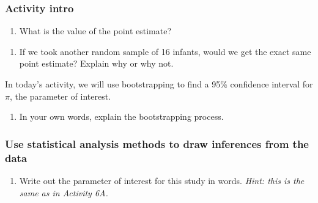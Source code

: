 \documentclass[
]{report}
\providecommand{\tightlist}{%
  \setlength{\itemsep}{0pt}\setlength{\parskip}{0pt}}
\begin{document}
\hypertarget{activity-intro}{%
\subsubsection*{Activity intro}\label{activity-intro}}

\begin{enumerate}
\def\labelenumi{\arabic{enumi}.}
\tightlist
\item
  What is the value of the point estimate?
\end{enumerate}

\vspace{0.3in}

\begin{enumerate}
\def\labelenumi{\arabic{enumi}.}
\setcounter{enumi}{1}
\tightlist
\item
  If we took another random sample of 16 infants, would we get the exact same point estimate? Explain why or why not.
\end{enumerate}

\vspace{0.5in}

In today's activity, we will use bootstrapping to find a 95\% confidence interval for \(\pi\), the parameter of interest.

\begin{enumerate}
\def\labelenumi{\arabic{enumi}.}
\setcounter{enumi}{2}
\tightlist
\item
  In your own words, explain the bootstrapping process.
  \vspace{0.5in}
\end{enumerate}

\hypertarget{use-statistical-analysis-methods-to-draw-inferences-from-the-data-1}{%
\subsubsection*{Use statistical analysis methods to draw inferences from the data}\label{use-statistical-analysis-methods-to-draw-inferences-from-the-data-1}}

\begin{enumerate}
\def\labelenumi{\arabic{enumi}.}
\setcounter{enumi}{3}
\tightlist
\item
  Write out the parameter of interest for this study in words. \emph{Hint: this is the same as in Activity 6A.}
\end{enumerate}
\end{document}
